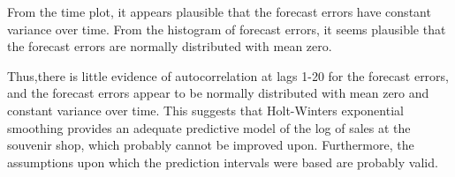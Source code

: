 	
	From the time plot, it appears plausible that the forecast errors have constant variance over time. From the
histogram of forecast errors, it seems plausible that the forecast errors are normally distributed with mean zero.
\par
Thus,there is little evidence of autocorrelation at lags 1-20 for the forecast errors, and the forecast errors appear
to be normally distributed with mean zero and constant variance over time. This suggests that Holt-Winters
exponential smoothing provides an adequate predictive model of the log of sales at the souvenir shop, which
probably cannot be improved upon. Furthermore, the assumptions upon which the prediction intervals were based
are probably valid.
